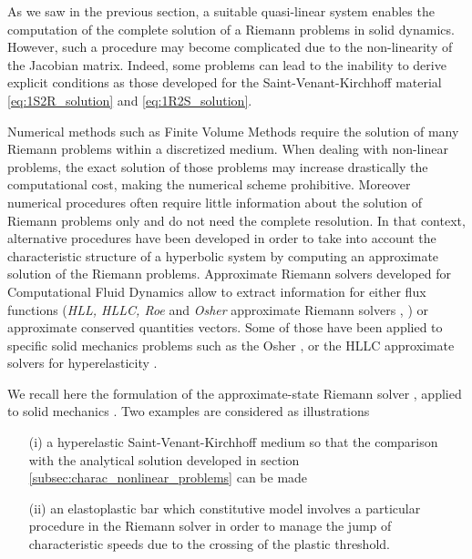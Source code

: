 As we saw in the previous section, a suitable quasi-linear system enables the computation of the complete solution of a Riemann problems in solid dynamics. However, such a procedure may become complicated due to the non-linearity of the Jacobian matrix. Indeed, some problems can lead to the inability to derive explicit conditions as those developed for the Saint-Venant-Kirchhoff material \eqref{eq:1S2R_solution} and \eqref{eq:1R2S_solution}.

Numerical methods such as Finite Volume Methods \cite{Leveque} require the solution of many Riemann problems within a discretized medium. When dealing with non-linear problems, the exact solution of those problems may increase drastically the computational cost, making the numerical scheme prohibitive. Moreover numerical procedures often require little information about the solution of Riemann problems only and do not need the complete resolution. In that context, alternative procedures have been developed in order to take into account the characteristic structure of a hyperbolic system by computing an approximate solution of the Riemann problems. Approximate Riemann solvers developed for Computational Fluid Dynamics allow to extract information for either flux functions (\textit{HLL, HLLC, Roe} and \textit{Osher} approximate Riemann solvers \cite{Trangenstein}, \cite{Toro}) or approximate conserved quantities vectors. Some of those have been applied to specific solid mechanics problems such as the Osher \cite{LEE_FVM}, \cite{Haider_FVM} or the HLLC \cite{Ortega_HLLD} approximate solvers for hyperelasticity .

We recall here the formulation of the approximate-state Riemann solver \cite[Chapter~9]{Toro}, applied to solid mechanics \cite[Chapter~22]{Leveque}. Two examples are considered as illustrations
\begin{itemize}
\item[(i)] a hyperelastic Saint-Venant-Kirchhoff medium so that the comparison with the analytical solution developed in section \ref{subsec:charac_nonlinear_problems} can be made
\item[(ii)] an elastoplastic bar which constitutive model involves a particular procedure in the Riemann solver in order to manage the jump of characteristic speeds due to the crossing of the plastic threshold.
\end{itemize}


